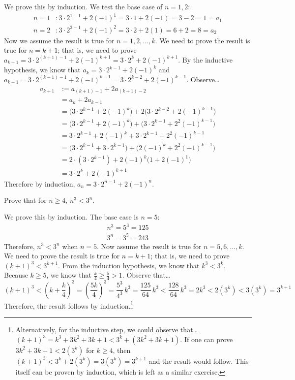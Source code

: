 \documentclass[11pt,letterpaper]{article}
\begin{document}
\sol We prove this by induction. We test the base case of $n= 1, 2$:
	\[
	\begin{aligned}
	n= 1&\colon 3 \cdot 2^{1-1} + 2(-1)^1= 3 \cdot 1 + 2(-1)= 3 - 2= 1= a_1 \\
	n= 2&\colon 3 \cdot 2^{2-1} + 2(-1)^2= 3 \cdot 2 + 2(1)= 6 + 2= 8= a_2
	\end{aligned}
	\]
Now we assume the result is true for $n= 1, 2, \ldots, k$. We need to prove the result is true for $n= k + 1$; that is, we need to prove $a_{k+1}= 3 \cdot 2^{(k+1) - 1} + 2(-1)^{k+1}= 3 \cdot 2^k + 2(-1)^{k+1}$. By the inductive hypothesis, we know that $a_k= 3 \cdot 2^{k-1} + 2(-1)^k$ and $a_{k-1}= 3 \cdot 2^{(k-1)-1} + 2(-1)^{k-1}= 3 \cdot 2^{k-2} + 2(-1)^{k-1}$. Observe\dots
	\[
	\begin{aligned}
	a_{k+1}&:= a_{(k+1)-1} + 2a_{(k+1)-2} \\
	&= a_k + 2a_{k-1} \\
	&= \big( 3 \cdot 2^{k-1} + 2(-1)^k \big) + 2 \big( 3 \cdot 2^{k-2} + 2(-1)^{k-1} \big) \\
	&= \big( 3 \cdot 2^{k-1} + 2(-1)^k \big) + \big( 3 \cdot 2^{k-1} + 2^2(-1)^{k-1} \big) \\
	&= 3 \cdot 2^{k-1} + 2(-1)^k + 3 \cdot 2^{k-1} + 2^2(-1)^{k-1} \\
	&= \big( 3 \cdot 2^{k-1} + 3 \cdot 2^{k-1} \big) + \big( 2(-1)^k + 2^2(-1)^{k-1} \big) \\
	&= 2 \cdot (3 \cdot 2^{k-1}) + 2(-1)^k \big(1 + 2(-1)^1 \big) \\
	&= 3 \cdot 2^k + 2(-1)^{k+1}
	\end{aligned}
	\]
Therefore by induction, $a_n= 3 \cdot 2^{n-1} + 2(-1)^n$. 



\newpage



 Prove that for $n \geq 4$, $n^3 < 3^n$. \pspace

\sol We prove this by induction. The base case is $n= 5$:
	\[
	\begin{aligned}
	n^3= 5^3= 125 \\
	3^n= 3^5= 243
	\end{aligned}
	\]
Therefore, $n^3 < 3^n$ when $n= 5$. Now assume the result is true for $n= 5, 6, \ldots, k$. We need to prove the result is true for $n= k+1$; that is, we need to prove $(k + 1)^3 < 3^{k+1}$. From the induction hypothesis, we know that $k^3 < 3^k$. Because $k \geq 5$, we know that $\frac{k}{4} \geq \frac{5}{4} > 1$. Observe that\dots
	\[
	(k + 1)^3 < \left(k + \dfrac{k}{4} \right)^3= \left( \dfrac{5k}{4} \right)^3= \dfrac{5^3}{4^3} \, k^3 = \dfrac{125}{64} \, k^3 < \dfrac{128}{64} \, k^3 = 2k^3 < 2 (3^k) < 3(3^k)= 3^{k+1}
	\]
Therefore, the result follows by induction.\footnote{Alternatively, for the inductive step, we could observe that\dots $(k + 1)^3= k^3 + 3k^2 + 3k + 1 < 3^k + (3k^2 + 3k + 1)$. If one can prove $3k^2 + 3k + 1 < 2(3^k)$ for $k \geq 4$, then $(k + 1)^3 < 3^k + 2(3^k)= 3(3^k)= 3^{k+1}$ and the result would follow. This itself can be proven by induction, which is left as a similar exercise.}
\end{document}
